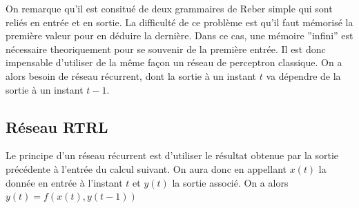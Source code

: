 On remarque qu'il est consitué de deux grammaires de Reber simple qui sont reliés en entrée et en sortie. La difficulté de ce problème est qu'il faut mémorisé la première valeur pour en déduire la dernière. Dans ce cas, une mémoire ''infini'' est nécessaire theoriquement pour se souvenir de la première entrée. Il est donc impensable d'utiliser de la même façon un réseau de perceptron classique. On a alors besoin de réseau récurrent, dont la sortie à un instant $t$ va dépendre de la sortie à un instant $t-1$.

\subsection{Réseau RTRL}

Le principe d'un réseau récurrent est d'utiliser le résultat obtenue par la sortie précédente à l'entrée du calcul suivant. On aura donc en appellant $x(t)$ la donnée en entrée à l'instant $t$ et $y(t)$ la sortie associé. On a alors $y(t) = f(x(t), y(t-1))$